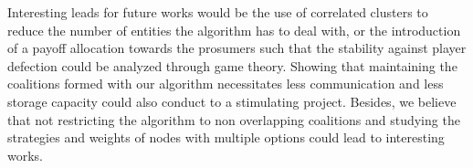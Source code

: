 \documentclass[conference]{IEEEtran}
\begin{document}
Interesting leads for future works would be the use of correlated clusters to reduce the number of entities the algorithm has to deal with, or the introduction of a payoff allocation towards the prosumers such that the stability against player defection could be analyzed through game theory. Showing that maintaining the coalitions formed with our algorithm necessitates less communication and less storage capacity could also conduct to a stimulating project. Besides, we believe that not restricting the algorithm to non overlapping coalitions and studying the strategies and weights of nodes with multiple options could lead to interesting works.



%
%
 
  

\end{document}
